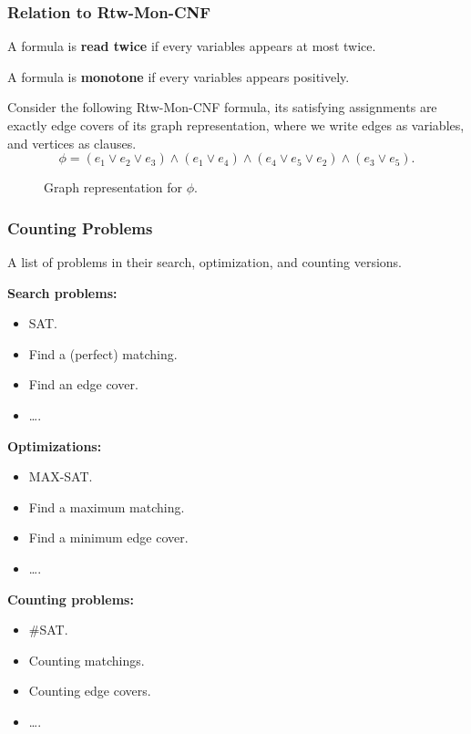 \documentclass[mathserif]{beamer}
\begin{document}
\begin{frame}
	\frametitle{Relation to Rtw-Mon-CNF}
    \begin{definition}
        A formula is {\bf read twice} if every variables appears at most twice.
        
        A formula is {\bf monotone} if every variables appears positively.
    \end{definition}
    \pause
	Consider the following Rtw-Mon-CNF formula, its satisfying assignments are exactly edge covers of its graph representation, where we write edges as variables, and vertices as clauses.
	\[
		\phi = (e_1 \vee e_2 \vee e_3) \wedge (e_1 \vee e_4) \wedge (e_4 \vee e_5 \vee e_2 ) \wedge (e_3 \vee e_5).
	\]

	\begin{figure}[htp]
		\centering
		
		\caption{Graph representation for $\phi$.}
	\end{figure}
\end{frame}

\begin{frame}
	\frametitle{Counting Problems}
	A list of problems in their search, optimization, and counting versions.
	\bigskip

	\begin{minipage}[tb]{0.3\linewidth}
		{\bf Search problems:}
		\begin{itemize}
			\item SAT.
				\pause
			\item Find a (perfect) matching.
				\pause
			\item Find an edge cover.
			\item \dots.
		\end{itemize}
	\end{minipage}
	\pause
	\begin{minipage}[tb]{0.3\linewidth}
		{\bf Optimizations:}
		\begin{itemize}
			\item MAX-SAT.
				\pause
			\item Find a maximum matching.
				\pause
			\item Find a minimum edge cover.
			\item \dots.
		\end{itemize}
	\end{minipage}
	\pause
	\begin{minipage}[tb]{0.3\linewidth}
		{\bf Counting problems:}
		\begin{itemize}
			\item \#SAT.
				\pause
			\item Counting matchings.
				\pause
			\item Counting edge covers.
			\item \dots.
		\end{itemize}
	\end{minipage}
\end{frame}
\end{document}

